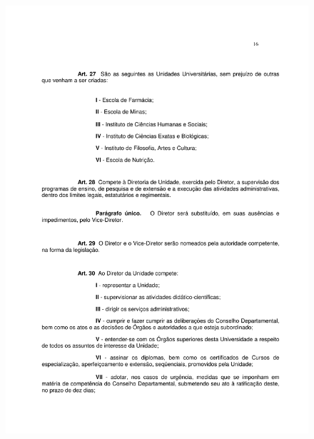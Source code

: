 \begin{figure}[p]
	\centering 
	\includegraphics[scale=0.7]{capitulos/resolucoes/cuni414/cuni414-16.pdf}
\end{figure}

